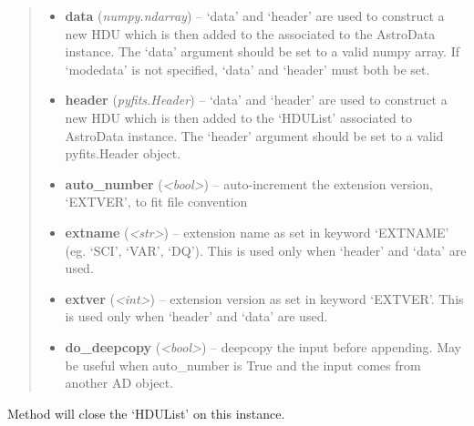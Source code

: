 \documentclass[letterpaper,10pt,english]{sphinxmanual}
\begin{document}
\begin{fulllineitems}
\begin{fulllineitems}
\begin{quote}
\begin{description}
\begin{itemize}
\item {} 
\textbf{data} (\emph{numpy.ndarray}) -- `data' and `header' are used to construct a new HDU which
is then added to the  associated to the 
AstroData instance. The `data' argument should be set to 
a valid numpy array. If `modedata' is not specified, 
`data' and `header' must both be set.

\item {} 
\textbf{header} (\emph{pyfits.Header}) -- `data' and `header' are used to construct a new 
HDU which is then added to the `HDUList' associated to 
AstroData instance. The `header' argument should be set 
to a valid pyfits.Header object.

\item {} 
\textbf{auto\_number} (\emph{\textless{}bool\textgreater{}}) -- auto-increment the extension version, `EXTVER', 
to fit file convention

\item {} 
\textbf{extname} (\emph{\textless{}str\textgreater{}}) -- extension name as set in keyword `EXTNAME' 
(eg. `SCI', `VAR', `DQ'). This is used only when 
`header' and `data' are used.

\item {} 
\textbf{extver} (\emph{\textless{}int\textgreater{}}) -- extension version as set in keyword `EXTVER'. This is 
used only when `header' and `data' are used.

\item {} 
\textbf{do\_deepcopy} (\emph{\textless{}bool\textgreater{}}) -- deepcopy the input before appending. May be useful
when auto\_number is True and the input comes from 
another AD object.

\end{itemize}

\end{description}\end{quote}

\end{fulllineitems}


\begin{fulllineitems}
\label{astro_class:astrodata.AstroData.close}
Method will close the `HDUList' on this instance.

\end{fulllineitems}



\end{fulllineitems}
\end{document}
